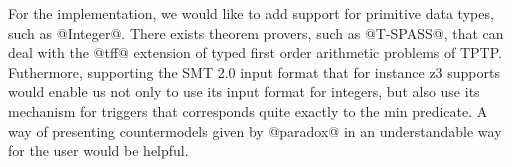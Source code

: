For the implementation, we would like to add support for primitive
data types, such as @Integer@. There exists theorem provers, such as
@T-SPASS@, that can deal with the @tff@ extension of typed first order
arithmetic problems of TPTP. Futhermore, supporting the SMT 2.0 input
format that for instance z3 supports would enable us not only to use
its input format for integers, but also use its mechanism for triggers
that corresponds quite exactly to the min predicate. A way of
presenting countermodels given by @paradox@ in an understandable way
for the user would be helpful.
